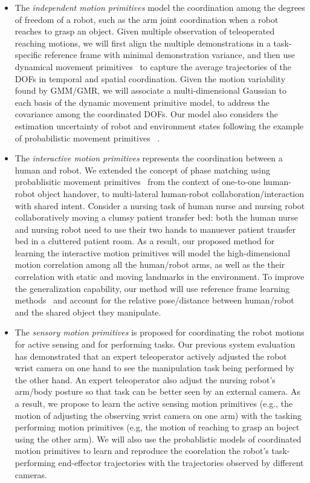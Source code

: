 \documentclass[letterpaper, 11 pt, onecolumn]{article}
\begin{document}
\begin{itemize}

\item The \textit{independent motion primitives} model the coordination among the degrees of freedom of a robot, such as the arm joint coordination when a robot reaches to grasp an object.    Given multiple observation of teleoperated reaching motions, we will first align the multiple demonstrations in a task-specific reference frame with minimal demonstration variance, and then use dynamical movement primitives~\cite{ijspeert2013dynamical} to capture the average trajectories of the DOFs in temporal and spatial coordination. Given the motion variability found by GMM/GMR, we will associate a multi-dimensional Gaussian to each basis of the dynamic movement primitive model, to address the covariance among the coordinated DOFs. Our model also considers the estimation uncertainty of robot and environment states following the example of probabilistic movement primitives ~\cite{meier2016probabilistic}. 

\item The \textit{interactive motion primitives} represents the coordination between a human and robot. We extended the concept of phase matching using probablisitic movement primitives~\cite{maeda2017phase} from the context of one-to-one human-robot object handover, to multi-lateral human-robot collaboration/interaction with shared intent. Consider a nursing task of human nurse and nursing robot collaboratively moving a clumsy patient transfer bed: both the human nurse and nursing robot need to use their two hands to manuever patient transfer bed in a cluttered patient room. As a result, our proposed method for learning the interactive motion primitives will model the high-dimensional motion correlation among all the human/robot arms, as well as the their correlation with static and moving landmarks in the environment. To improve the generalization capability, our method will use reference frame learning methods~\cite{cederborg2010incremental,dong2012learning} and account for the relative pose/distance between human/robot and the shared object they manipulate.  

\item The \textit{sensory motion primitives} is proposed for coordinating the robot motions for active sensing and for performing tasks. Our previous system evaluation has demonstrated that an expert teleoperator actively adjusted the robot wrist camera on one hand to see the manipulation task being performed by the other hand. An expert teleoperator also adjust the nursing  robot's arm/body posture so that task can be better seen by an external camera. As a result, we propose to learn the active sensing motion primitives (e.g., the motion of adjusting the observing wrist camera on one arm) with the tasking performing motion primitives (e.g, the motion of reaching to grasp an boject using the other arm). We will also use the probablistic models of coordinated motion primitives to learn and reproduce the coorelation the robot's task-performing end-effector trajectories     with the trajectories observed by different cameras. 


\end{itemize}
\end{document}
